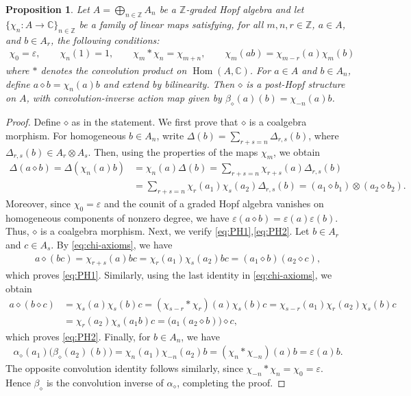 \documentclass[11pt,english]{article}
\newcommand{\eps}{\varepsilon}
\newcommand{\Del}{\Delta}
\newcommand{\act}{\mathbin{\diamond}}
\newtheorem{proposition}[lemma]{Proposition}
\theoremstyle{definition}
\begin{document}
\begin{proposition}\label{prop:graded}
Let $A=\bigoplus_{n\in\mathbb{Z}}A_n$ be a $\mathbb{Z}$-graded Hopf algebra
and let $\{\chi_n:A\to\mathbb{C}\}_{n\in\mathbb{Z}}$ be a 
family of linear maps satisfying, for all
$m,n,r\in\mathbb Z$, $a\in A$, and $b\in A_r$,
the following conditions:
\begin{equation}\label{eq:chi-axioms}
\begin{gathered}
\chi_0=\eps,\qquad \chi_n(1)=1,\qquad
\chi_m*\chi_n=\chi_{m+n}, \qquad
\chi_m(ab)=\chi_{m-r}(a)\chi_m(b)
\end{gathered}
\end{equation}
where $*$ denotes the convolution product on
$\operatorname{Hom}(A,\mathbb{C})$. For $a\in A$ and $b\in A_n$, define
$a\act b=\chi_n(a)b$ and extend by bilinearity.
Then $\act$ is a post-Hopf structure on $A$, with
convolution-inverse action map given by $\beta_{\act}(a)(b)=\chi_{-n}(a)b$.
\end{proposition}

\begin{proof}
Define $\act$ as in the statement. We first prove that $\act$ is a coalgebra morphism. 
For homogeneous $b\in A_n$, write $\Del(b)=\sum_{r+s=n}\Del_{r,s}(b)$, where $
\Del_{r,s}(b)\in A_r\otimes A_s$.
Then, using the properties of the maps
$\chi_m$, we obtain
\begin{align*}
\Del(a\act b)
=\Del(\chi_n(a)b)
&=\chi_n(a)\Del(b)=\sum_{r+s=n}\chi_{r+s}(a)\Del_{r,s}(b)\\&=\sum_{r+s=n}\chi_r(a_1)\chi_s(a_2)
\Del_{r,s}(b)=(a_1\act b_1)\otimes(a_2\act b_2).
\end{align*}
Moreover, since $\chi_0=\eps$ and the counit of a graded Hopf algebra vanishes
on homogeneous components of nonzero degree, we have
$\eps(a\act b)=\eps(a)\eps(b)$.
Thus, $\act$ is a coalgebra morphism.
Next,  we verify \eqref{eq:PH1},\eqref{eq:PH2}. Let $b\in A_r$ and $c\in A_s$. By
\eqref{eq:chi-axioms}, we have
\[
\begin{aligned}
a\act(bc)
=\chi_{r+s}(a)bc=\chi_r(a_1)\chi_s(a_2)bc=(a_1\act b)(a_2\act c),
\end{aligned}
\]
which proves \eqref{eq:PH1}.
Similarly, using the last identity in
\eqref{eq:chi-axioms}, we obtain
\[
\begin{aligned}
a\act(b\act c)&=\chi_s(a)\chi_s(b)c=(\chi_{s-r}*\chi_r)(a)\chi_s(b)c=\chi_{s-r}(a_1)\chi_r(a_2)\chi_s(b)c\\
&=\chi_r(a_2)\chi_s(a_1b)c=\bigl(a_1(a_2\act b)\bigr)\act c,
\end{aligned}
\]
which proves \eqref{eq:PH2}.
Finally, for $b\in A_n$, we have
\[
\begin{aligned}
\alpha_{\act}(a_1)\bigl(\beta_{\act}(a_2)(b)\bigr)
=\chi_n(a_1)\chi_{-n}(a_2)b=(\chi_n*\chi_{-n})(a)b=\eps(a)b.
\end{aligned}
\]
The opposite convolution identity follows similarly,
since $\chi_{-n}*\chi_n=\chi_0=\eps$.
Hence $\beta_{\act}$ is the convolution inverse of
$\alpha_{\act}$, completing the proof.

\end{proof}
\end{document}
